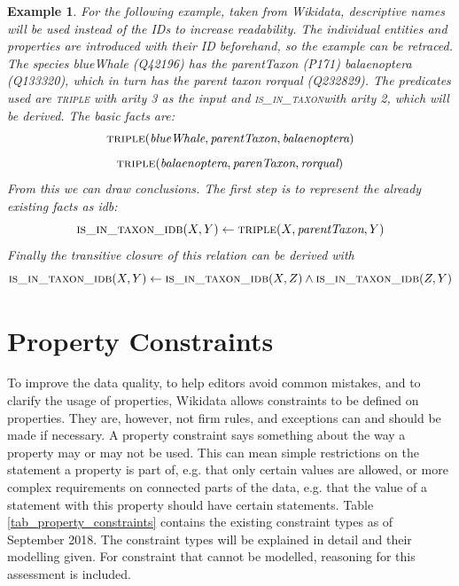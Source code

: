 \documentclass[hyperref,bachelorofscience,fleqn]{cgvpub}
\newtheorem{example}{Example}
\begin{document}
\begin{example}
For the following example, taken from Wikidata, descriptive names will be used instead of the IDs to increase readability. The individual entities and properties are introduced with their ID beforehand, so the example can be retraced. The species \emph{blueWhale} (Q42196) has the \emph{parentTaxon} (P171) \emph{balaenoptera} (Q133320), which in turn has the parent taxon \emph{rorqual} (Q232829). The predicates used are \textsc{triple} with arity 3 as the input and \textsc{is\_in\_taxon}with arity 2, which will be derived. The basic facts are:
\[\textsc{triple}(\emph{blueWhale}, \emph{parentTaxon}, \emph{balaenoptera})\]
\[\textsc{triple}(\emph{balaenoptera}, \emph{parenTaxon}, \emph{rorqual})\]
From this we can draw conclusions. The first step is to represent the already existing facts as idb:
\[\textsc{is\_in\_taxon\_idb}(X, Y) \leftarrow \textsc{triple}(X, \emph{parentTaxon}, Y)\]
Finally the transitive closure of this relation can be derived with
\[\textsc{is\_in\_taxon\_idb}(X, Y) \leftarrow \textsc{is\_in\_taxon\_idb}(X, Z) \wedge \textsc{is\_in\_taxon\_idb}(Z, Y)\]
\end{example}

\chapter{Property Constraints}\label{cha_property_constraints}

To improve the data quality, to help editors avoid common mistakes, and to clarify the usage of properties, Wikidata allows constraints to be defined on properties. They are, however, not firm rules, and exceptions can and should be made if necessary. A property constraint says something about the way a property may or may not be used. This can mean simple restrictions on the statement a property is part of, e.g. that only certain values are allowed, or more complex requirements on connected parts of the data, e.g. that the value of a statement with this property should have certain statements. Table \ref{tab_property_constraints} contains the existing constraint types as of September 2018. The constraint types will be explained in detail and their modelling given. For constraint that cannot be modelled, reasoning for this assessment is included.
\end{document}
